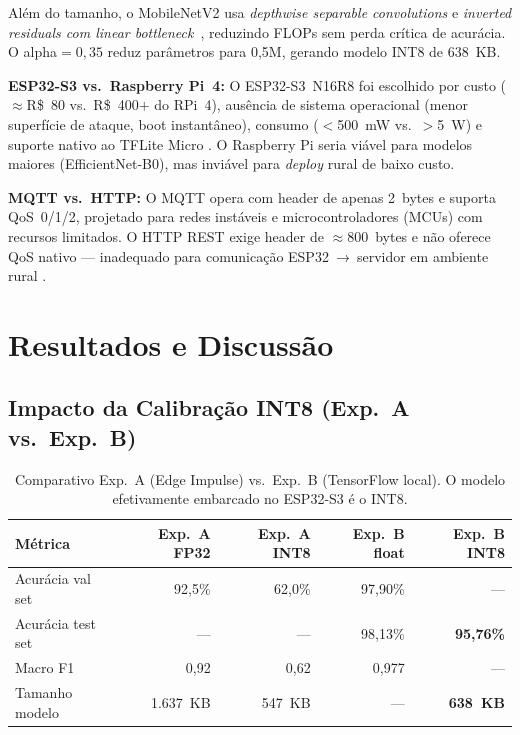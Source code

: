 \documentclass[12pt]{article}
\begin{document}
Além do tamanho, o MobileNetV2 usa \textit{depthwise separable convolutions} e
\textit{inverted residuals com linear bottleneck}~\cite{sandler2018}, reduzindo
FLOPs sem perda crítica de acurácia. O alpha$=0{,}35$ reduz parâmetros para 0,5M,
gerando modelo INT8 de 638~KB.

\textbf{ESP32-S3 vs.\ Raspberry Pi~4:} O ESP32-S3~N16R8 foi escolhido por custo
($\approx$R\$~80 vs.\ R\$~400$+$ do RPi~4), ausência de sistema operacional
(menor superfície de ataque, boot instantâneo), consumo ($<$500~mW vs.\ $>$5~W)
e suporte nativo ao TFLite Micro \cite{warden2019}. O Raspberry Pi seria viável
para modelos maiores (EfficientNet-B0), mas inviável para \textit{deploy} rural de baixo custo.

\textbf{MQTT vs.\ HTTP:} O MQTT opera com header de apenas 2~bytes e suporta
QoS~0/1/2, projetado para redes instáveis e microcontroladores (MCUs) com recursos
limitados. O HTTP
REST exige header de $\approx$800~bytes e não oferece QoS nativo --- inadequado
para comunicação ESP32~→~servidor em ambiente rural \cite{oasis2019}.


\section{Resultados e Discussão}

\subsection{Impacto da Calibração INT8 (Exp.~A vs.\ Exp.~B)}

\begin{table}[ht]
\centering
\caption{Comparativo Exp.~A (Edge Impulse) vs.\ Exp.~B (TensorFlow local).
O modelo efetivamente embarcado no ESP32-S3 é o INT8.}
\label{tab:ab}
\begin{tabular}{@{}lrrrr@{}}
\toprule
\textbf{Métrica} & \textbf{Exp.~A FP32} & \textbf{Exp.~A INT8} & \textbf{Exp.~B float} & \textbf{Exp.~B INT8} \\
\midrule
Acurácia val set  & 92,5\% & 62,0\% & 97,90\% & --- \\
Acurácia test set & ---    & ---    & 98,13\% & \textbf{95,76\%} \\
Macro F1          & 0,92   & 0,62   & 0,977   & --- \\
Tamanho modelo    & 1.637~KB & 547~KB & ---    & \textbf{638~KB} \\
\bottomrule
\end{tabular}
\end{table}
\end{document}
